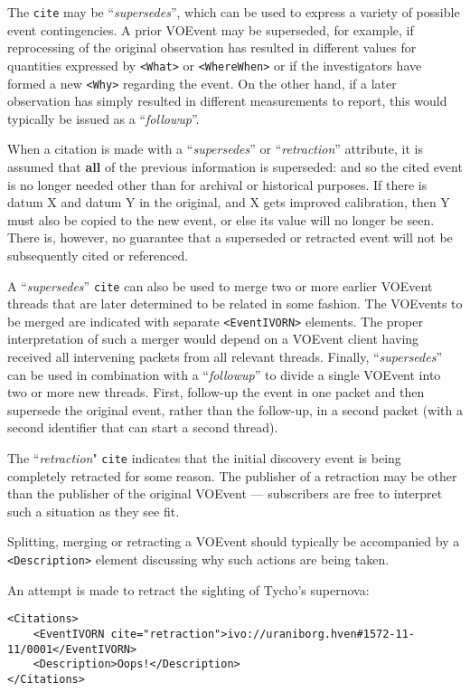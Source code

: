 \documentclass[11pt,a4paper]{ivoa}
\begin{document}
The \texttt{cite} may be ``\emph{supersedes}'', which can be used to express a 
variety of possible event contingencies. A prior VOEvent may be superseded, for 
example, if reprocessing of the original observation has resulted in different 
values for quantities expressed by \texttt{<What>} or \texttt{<WhereWhen>} or if the 
investigators have formed a new \texttt{<Why>} regarding the event. On the other 
hand, if a later observation has simply resulted in different measurements to 
report, this would typically be issued as a ``\emph{followup}''. 

When a citation is made with a ``\emph{supersedes}'' or ``\emph{retraction}''
attribute, it is assumed that {\bf all} of the previous information is
superseded: and so the cited event is no longer needed other than for archival
or historical purposes. If there is datum X and datum Y in the original, and X
gets improved calibration, then Y must also be copied to the new event, or else
its value will no longer be seen. There is, however, no guarantee that a
superseded or retracted event will not be subsequently cited or referenced.

A ``\emph{supersedes}'' \texttt{cite} can also be used to merge two or more earlier
VOEvent threads that are later determined to be related in some fashion. The 
VOEvents to be merged are indicated with separate \texttt{<EventIVORN>} elements. 
The proper interpretation of such a merger would depend on a VOEvent client 
having received all intervening packets from all relevant threads. Finally, 
``\emph{supersedes}'' can be used in combination with a ``\emph{followup}'' to 
divide a single VOEvent into two or more new threads. First, follow-up the event
in one packet and then supersede the original event, rather than the follow-up,
in a second packet (with a second identifier that can start a second thread).

The ``\emph{retraction}" \texttt{cite} indicates that the initial discovery event 
is being completely retracted for some reason. The publisher of a retraction may
be other than the publisher of the original VOEvent --- subscribers are free to
interpret such a situation as they see fit.

Splitting, merging or retracting a VOEvent should typically be accompanied by a
\texttt{<Description>} element discussing why such actions are being taken. 

An attempt is made to retract the sighting of Tycho's supernova:
\begin{lstlisting}
<Citations>
    <EventIVORN cite="retraction">ivo://uraniborg.hven#1572-11-11/0001</EventIVORN>
    <Description>Oops!</Description>
</Citations>
\end{lstlisting}
\end{document}
